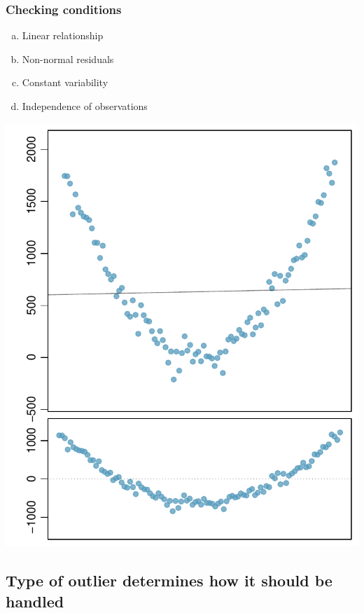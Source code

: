 \documentclass[11pt,containsverbatim,handout,xcolor=xelatex,dvipsnames,table]{beamer}
\newcommand{\solnMult}[1]{#1}
\begin{document}
\begin{frame}
\frametitle{Checking conditions}

{
\begin{enumerate}[(a)]
\item \solnMult{Linear relationship}
\item Non-normal residuals
\item Constant variability
\item Independence of observations
\end{enumerate}
}
{
\begin{center}
\includegraphics[width=\textwidth]{figures/problems/nonlinear}
\end{center}
}

\end{frame}


\subsection{Type of outlier determines how it should be handled}
\label{mi6}
\end{document}
